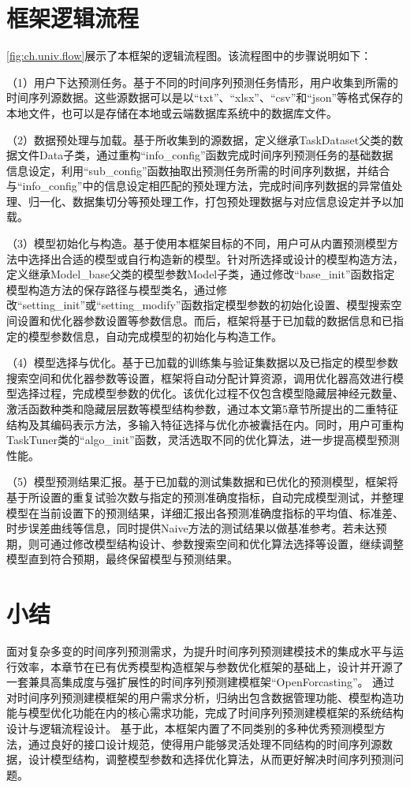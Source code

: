 \section{框架逻辑流程}
\autoref{fig:ch.univ.flow}展示了本框架的逻辑流程图。该流程图中的步骤说明如下：

（1）用户下达预测任务。基于不同的时间序列预测任务情形，用户收集到所需的时间序列源数据。这些源数据可以是以“txt”、“xlsx”、“csv”和“json”等格式保存的本地文件，也可以是存储在本地或云端数据库系统中的数据库文件。

（2）数据预处理与加载。基于所收集到的源数据，定义继承TaskDataset父类的数据文件Data子类，通过重构“info_config”函数完成时间序列预测任务的基础数据信息设定，利用“sub_config”函数抽取出预测任务所需的时间序列数据，并结合与“info_config”中的信息设定相匹配的预处理方法，完成时间序列数据的异常值处理、归一化、数据集切分等预处理工作，打包预处理数据与对应信息设定并予以加载。

（3）模型初始化与构造。基于使用本框架目标的不同，用户可从内置预测模型方法中选择出合适的模型或自行构造新的模型。针对所选择或设计的模型构造方法，定义继承Model_base父类的模型参数Model子类，通过修改“base_init”函数指定模型构造方法的保存路径与模型类名，通过修改“setting_init”或“setting_modify”函数指定模型参数的初始化设置、模型搜索空间设置和优化器参数设置等参数信息。而后，框架将基于已加载的数据信息和已指定的模型参数信息，自动完成模型的初始化与构造工作。

（4）模型选择与优化。基于已加载的训练集与验证集数据以及已指定的模型参数搜索空间和优化器参数等设置，框架将自动分配计算资源，调用优化器高效进行模型选择过程，完成模型参数的优化。该优化过程不仅包含模型隐藏层神经元数量、激活函数种类和隐藏层层数等模型结构参数，通过本文第5章节所提出的二重特征结构及其编码表示方法，多输入特征选择与优化亦被囊括在内。同时，用户可重构TaskTuner类的“algo_init”函数，灵活选取不同的优化算法，进一步提高模型预测性能。

（5）模型预测结果汇报。基于已加载的测试集数据和已优化的预测模型，框架将基于所设置的重复试验次数与指定的预测准确度指标，自动完成模型测试，并整理模型在当前设置下的预测结果，详细汇报出各预测准确度指标的平均值、标准差、时步误差曲线等信息，同时提供Naive方法的测试结果以做基准参考。若未达预期，则可通过修改模型结构设计、参数搜索空间和优化算法选择等设置，继续调整模型直到符合预期，最终保留模型与预测结果。

\section{小结}
面对复杂多变的时间序列预测需求，为提升时间序列预测建模技术的集成水平与运行效率，本章节在已有优秀模型构造框架与参数优化框架的基础上，设计并开源了一套兼具高集成度与强扩展性的时间序列预测建模框架“OpenForcasting”。
通过对时间序列预测建模框架的用户需求分析，归纳出包含数据管理功能、模型构造功能与模型优化功能在内的核心需求功能，完成了时间序列预测建模框架的系统结构设计与逻辑流程设计。
基于此，本框架内置了不同类别的多种优秀预测模型方法，通过良好的接口设计规范，使得用户能够灵活处理不同结构的时间序列源数据，设计模型结构，调整模型参数和选择优化算法，从而更好解决时间序列预测问题。


